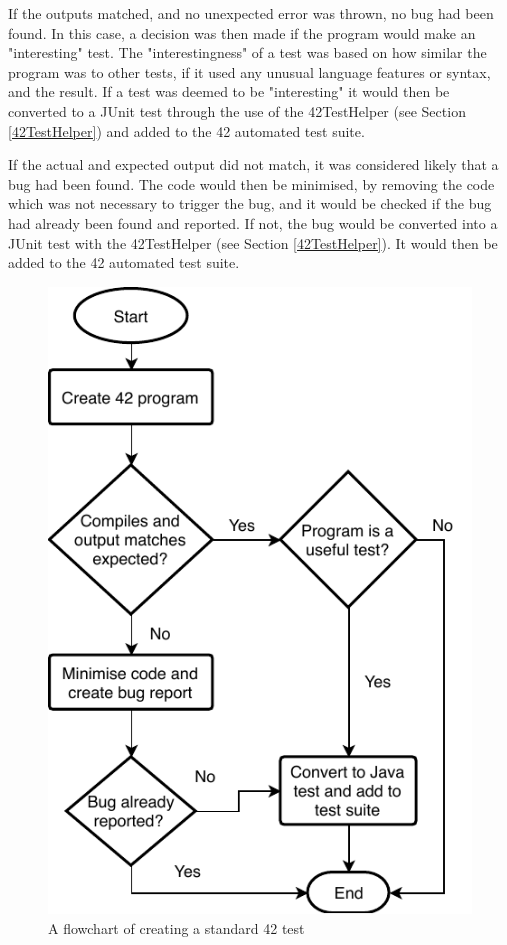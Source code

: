  If the outputs matched, and no unexpected error was thrown, no bug had been found. In this case, a decision was then made if the program would make an "interesting" test. The "interestingness" of a test was based on how similar the program was to other tests, if it used any unusual language features or syntax, and the result. If a test was deemed to be "interesting" it would then be converted to a JUnit test through the use of the 42TestHelper (see Section \ref{42TestHelper}) and added to the 42 automated test suite.

If the actual and expected output did not match, it was considered likely that a bug had been found. The code would then be minimised, by removing the code which was not necessary to trigger the bug, and it would be checked if the bug had already been found and reported. If not, the bug would be converted into a JUnit test with the 42TestHelper (see Section \ref{42TestHelper}). It would then be added to the 42 automated test suite.

\begin{figure}[h]
\centering
\includegraphics{flowchart}
\caption{A flowchart of creating a standard 42 test}
\end{figure}
